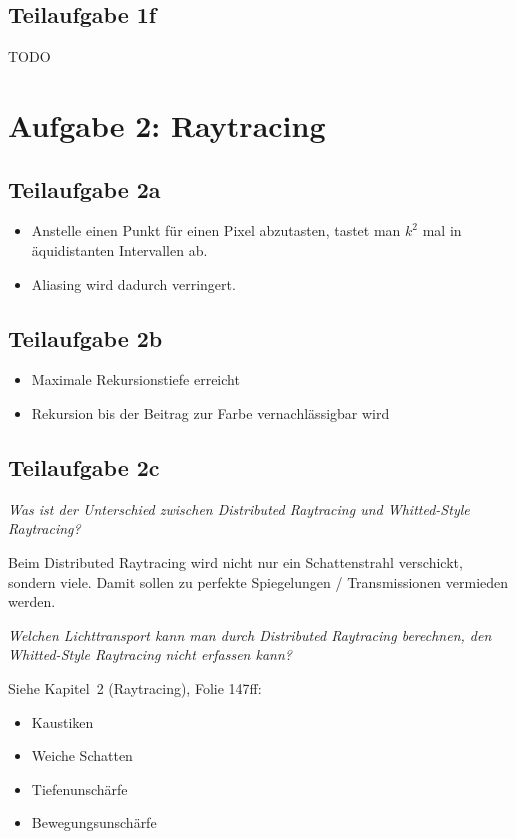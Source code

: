 \documentclass[a4paper]{scrartcl}
\begin{document}
\subsection*{Teilaufgabe 1f}
TODO

\section*{Aufgabe 2: Raytracing}
\subsection*{Teilaufgabe 2a}
\begin{itemize}
    \item Anstelle einen Punkt für einen Pixel abzutasten, tastet man
          $k^2$ mal in äquidistanten Intervallen ab.
    \item Aliasing wird dadurch verringert.
\end{itemize}

\subsection*{Teilaufgabe 2b}
\begin{itemize}
    \item Maximale Rekursionstiefe erreicht
    \item Rekursion bis der Beitrag zur Farbe vernachlässigbar wird
\end{itemize}

\subsection*{Teilaufgabe 2c}

\textit{Was ist der Unterschied zwischen Distributed Raytracing und Whitted-Style Raytracing?}

Beim Distributed Raytracing wird nicht nur ein Schattenstrahl verschickt, sondern
viele. Damit sollen zu perfekte Spiegelungen / Transmissionen vermieden werden.

\textit{Welchen Lichttransport kann man durch Distributed Raytracing berechnen, den
Whitted-Style Raytracing nicht erfassen kann?}

Siehe Kapitel~2 (Raytracing), Folie 147ff:

\begin{itemize}
    \item Kaustiken
    \item Weiche Schatten
    \item Tiefenunschärfe
    \item Bewegungsunschärfe
\end{itemize}
\end{document}
